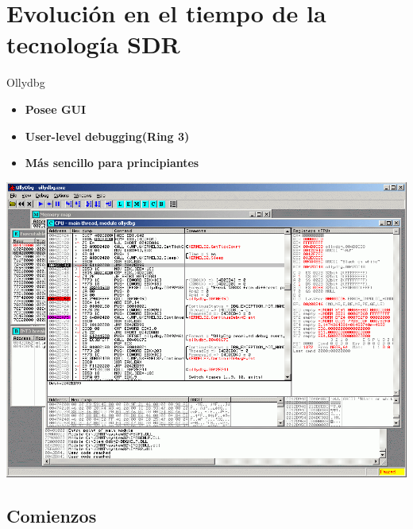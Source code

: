 \documentclass{beamer}
\begin{document}
\section{Evolución en el tiempo de la tecnología SDR}

\begin{frame}{Ollydbg}

\begin{itemize}
	\item \textbf{Posee GUI}
	\item \textbf{User-level debugging(Ring 3)} 
	\item \textbf{Más sencillo para principiantes}
\end{itemize}
\includegraphics[scale=0.25]{OllyDbg2.png}
\end{frame}

\subsection{Comienzos}
\end{document}
